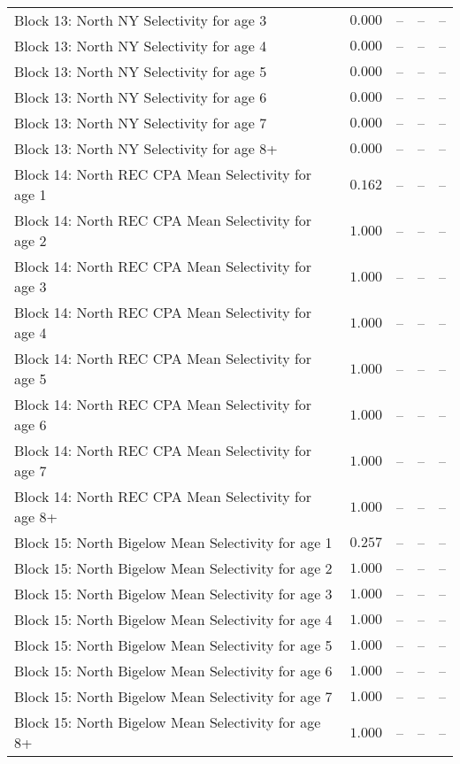 \documentclass[
]{article}
\begin{document}
\begin{landscape}
\begin{longtable}[t]{lrrrr}
\addlinespace
Block 13: North NY Selectivity for age 3 & $0.000$ & -- & -- & --\\
Block 13: North NY Selectivity for age 4 & $0.000$ & -- & -- & --\\
Block 13: North NY Selectivity for age 5 & $0.000$ & -- & -- & --\\
Block 13: North NY Selectivity for age 6 & $0.000$ & -- & -- & --\\
Block 13: North NY Selectivity for age 7 & $0.000$ & -- & -- & --\\
\addlinespace
Block 13: North NY Selectivity for age 8+ & $0.000$ & -- & -- & --\\
Block 14: North REC CPA Mean Selectivity for age 1 & $0.162$ & -- & -- & --\\
Block 14: North REC CPA Mean Selectivity for age 2 & $1.000$ & -- & -- & --\\
Block 14: North REC CPA Mean Selectivity for age 3 & $1.000$ & -- & -- & --\\
Block 14: North REC CPA Mean Selectivity for age 4 & $1.000$ & -- & -- & --\\
\addlinespace
Block 14: North REC CPA Mean Selectivity for age 5 & $1.000$ & -- & -- & --\\
Block 14: North REC CPA Mean Selectivity for age 6 & $1.000$ & -- & -- & --\\
Block 14: North REC CPA Mean Selectivity for age 7 & $1.000$ & -- & -- & --\\
Block 14: North REC CPA Mean Selectivity for age 8+ & $1.000$ & -- & -- & --\\
Block 15: North Bigelow Mean Selectivity for age 1 & $0.257$ & -- & -- & --\\
\addlinespace
Block 15: North Bigelow Mean Selectivity for age 2 & $1.000$ & -- & -- & --\\
Block 15: North Bigelow Mean Selectivity for age 3 & $1.000$ & -- & -- & --\\
Block 15: North Bigelow Mean Selectivity for age 4 & $1.000$ & -- & -- & --\\
Block 15: North Bigelow Mean Selectivity for age 5 & $1.000$ & -- & -- & --\\
Block 15: North Bigelow Mean Selectivity for age 6 & $1.000$ & -- & -- & --\\
\addlinespace
Block 15: North Bigelow Mean Selectivity for age 7 & $1.000$ & -- & -- & --\\
Block 15: North Bigelow Mean Selectivity for age 8+ & $1.000$ & -- & -- & --\\

\end{longtable}
\end{landscape}
\end{document}
